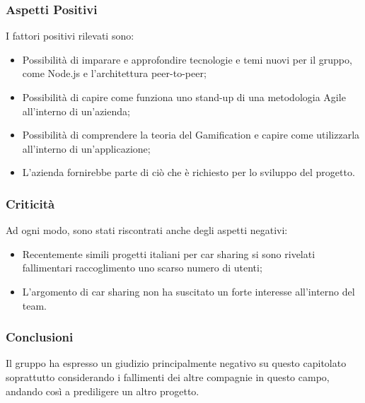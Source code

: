 \subsubsection{Aspetti Positivi}
I fattori positivi rilevati sono:
\begin{itemize}
	\item Possibilità di imparare e approfondire tecnologie e temi nuovi per il gruppo, come Node.js e l'architettura peer-to-peer;
	\item Possibilità di capire come funziona uno stand-up di una metodologia Agile all'interno di un'azienda;
	\item Possibilità di comprendere la teoria del Gamification e capire come utilizzarla all'interno di un'applicazione;
	\item L'azienda fornirebbe parte di ciò che è richiesto per lo sviluppo del progetto.
\end{itemize}

\subsubsection{Criticità}
Ad ogni modo, sono stati riscontrati anche degli aspetti negativi:
\begin{itemize}
	\item Recentemente simili progetti italiani per car sharing si sono rivelati fallimentari raccoglimento uno scarso numero di utenti;
	\item L'argomento di car sharing non ha suscitato un forte interesse all'interno del team.
\end{itemize}
\subsubsection{Conclusioni}
Il gruppo ha espresso un giudizio principalmente negativo su questo capitolato soprattutto considerando i fallimenti dei altre compagnie in questo campo, 
andando così a prediligere un altro progetto.